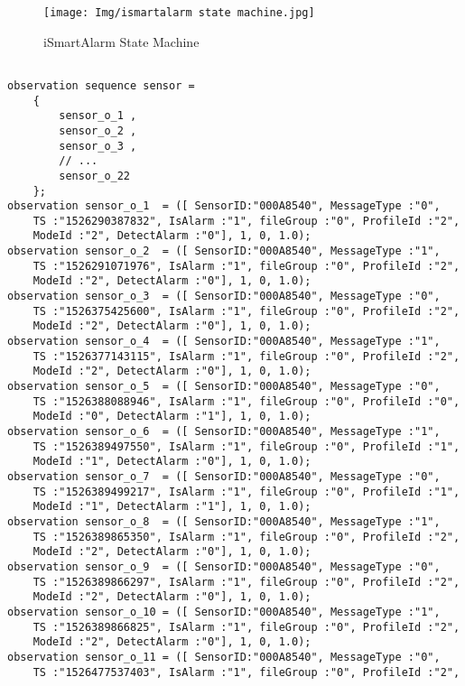 \documentclass{easychair}
\begin{document}
\begin{figure}[H]
    \centering
    \texttt{[image: Img/ismartalarm state machine.jpg]}
    \caption{iSmartAlarm State Machine}
    \label{fig:iSmartAlarm State Machine}
\end{figure}

\lstset{language=Lucid}
\lstset{frame=lines}
\lstset{basicstyle=\footnotesize}
\begin{lstlisting}

observation sequence sensor =
	{
		sensor_o_1 ,
		sensor_o_2 ,
		sensor_o_3 ,
		// ...
		sensor_o_22
	};			    
observation sensor_o_1	= ([ SensorID:"000A8540", MessageType :"0",
	TS :"1526290387832", IsAlarm :"1", fileGroup :"0", ProfileId :"2",
	ModeId :"2", DetectAlarm :"0"], 1, 0, 1.0);
observation sensor_o_2	= ([ SensorID:"000A8540", MessageType :"1",
	TS :"1526291071976", IsAlarm :"1", fileGroup :"0", ProfileId :"2",
	ModeId :"2", DetectAlarm :"0"], 1, 0, 1.0);
observation sensor_o_3	= ([ SensorID:"000A8540", MessageType :"0",
	TS :"1526375425600", IsAlarm :"1", fileGroup :"0", ProfileId :"2",
	ModeId :"2", DetectAlarm :"0"], 1, 0, 1.0);
observation sensor_o_4	= ([ SensorID:"000A8540", MessageType :"1",
	TS :"1526377143115", IsAlarm :"1", fileGroup :"0", ProfileId :"2",
	ModeId :"2", DetectAlarm :"0"], 1, 0, 1.0);
observation sensor_o_5	= ([ SensorID:"000A8540", MessageType :"0",
	TS :"1526388088946", IsAlarm :"1", fileGroup :"0", ProfileId :"0",
	ModeId :"0", DetectAlarm :"1"], 1, 0, 1.0);
observation sensor_o_6	= ([ SensorID:"000A8540", MessageType :"1",
	TS :"1526389497550", IsAlarm :"1", fileGroup :"0", ProfileId :"1",
	ModeId :"1", DetectAlarm :"0"], 1, 0, 1.0);
observation sensor_o_7	= ([ SensorID:"000A8540", MessageType :"0",
	TS :"1526389499217", IsAlarm :"1", fileGroup :"0", ProfileId :"1",
	ModeId :"1", DetectAlarm :"1"], 1, 0, 1.0);
observation sensor_o_8	= ([ SensorID:"000A8540", MessageType :"1",
	TS :"1526389865350", IsAlarm :"1", fileGroup :"0", ProfileId :"2",
	ModeId :"2", DetectAlarm :"0"], 1, 0, 1.0);
observation sensor_o_9	= ([ SensorID:"000A8540", MessageType :"0",
	TS :"1526389866297", IsAlarm :"1", fileGroup :"0", ProfileId :"2",
	ModeId :"2", DetectAlarm :"0"], 1, 0, 1.0);
observation sensor_o_10 = ([ SensorID:"000A8540", MessageType :"1",
	TS :"1526389866825", IsAlarm :"1", fileGroup :"0", ProfileId :"2",
	ModeId :"2", DetectAlarm :"0"], 1, 0, 1.0);
observation sensor_o_11 = ([ SensorID:"000A8540", MessageType :"0",
	TS :"1526477537403", IsAlarm :"1", fileGroup :"0", ProfileId :"2",

\end{lstlisting}
\end{document}
